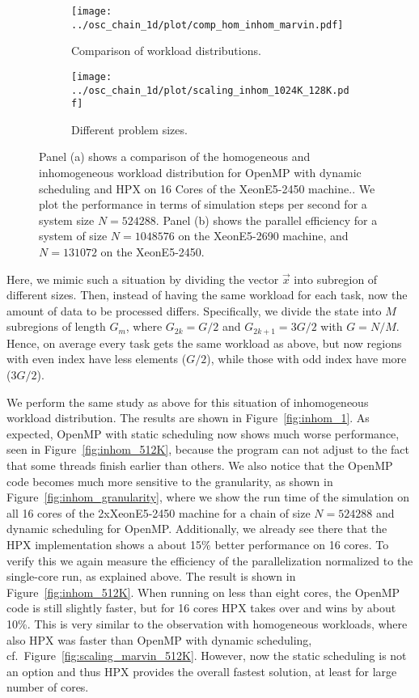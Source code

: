 \documentclass[10pt]{scrartcl}
\begin{document}
\begin{figure}
 \begin{subfigure}[b]{0.49\textwidth}
  \centering
  \texttt{[image: ../osc\_chain\_1d/plot/comp\_hom\_inhom\_marvin.pdf]}
  \caption{Comparison of workload distributions.} 
  \label{fig:comp_hom_inhom_marvin}
 \end{subfigure}
 \begin{subfigure}[b]{0.51\textwidth}
  \centering
  \texttt{[image: ../osc\_chain\_1d/plot/scaling\_inhom\_1024K\_128K.pdf]}
  \caption{Different problem sizes.} 
  \label{fig:inhom_1024K}
 \end{subfigure}
 \caption{Panel (a) shows a comparison of the homogeneous and inhomogeneous workload distribution for OpenMP with dynamic scheduling and HPX on 16 Cores of the XeonE5-2450 machine.. We plot the performance in terms of simulation steps per second for a system size $N=524288$. Panel (b) shows the parallel efficiency for a system of size $N=1048576$ on the XeonE5-2690 machine, and $N=131072$ on the XeonE5-2450.}
 \label{fig:inhom_2}
\end{figure}

Here, we mimic such a situation by dividing the vector $\vec x$ into subregion of different sizes.
Then, instead of having the same workload for each task, now the amount of data to be processed differs.
Specifically, we divide the state into $M$ subregions of length $G_m$, where $G_{2k}=G/2$ and $G_{2k+1}=3G/2$ with $G=N/M$.
Hence, on average every task gets the same workload as above, but now regions with even index have less elements ($G/2$), while those with odd index have more ($3G/2$).

We perform the same study as above for this situation of inhomogeneous workload distribution.
The results are shown in Figure~\ref{fig:inhom_1}.
As expected, OpenMP with static scheduling now shows much worse performance, seen in Figure~\ref{fig:inhom_512K}, because the program can not adjust to the fact that some threads finish earlier than others.
We also notice that the OpenMP code becomes much more sensitive to the granularity, as shown in Figure~\ref{fig:inhom_granularity}, where we show the run time of the simulation on all 16 cores of the  2xXeonE5-2450 machine for a chain of size $N=524288$ and dynamic scheduling for OpenMP.
Additionally, we already see there that the HPX implementation shows a about 15\% better performance on 16 cores.
To verify this we again measure the efficiency of the parallelization normalized to the single-core run, as explained above.
The result is shown in Figure~\ref{fig:inhom_512K}.
When running on less than eight cores, the OpenMP code is still slightly faster, but for 16 cores HPX takes over and wins by about 10\%.
This is very similar to the observation with homogeneous workloads, where also HPX was faster than OpenMP with dynamic scheduling, cf.\ Figure~\ref{fig:scaling_marvin_512K}.
However, now the static scheduling is not an option and thus HPX provides the overall fastest solution, at least for large number of cores.
\end{document}
